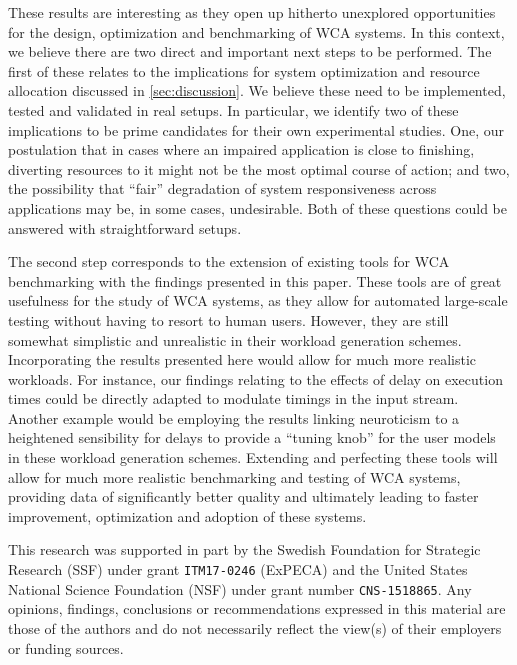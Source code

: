 These results are interesting as they open up hitherto unexplored opportunities for the design, optimization and benchmarking of WCA systems.
In this context, we believe there are two direct and important next steps to be performed.
The first of these relates to the implications for system optimization and resource allocation discussed in \cref{sec:discussion}.
We believe these need to be implemented, tested and validated in real setups.
In particular, we identify two of these implications to be prime candidates for their own experimental studies.
One, our postulation that in cases where an impaired application is close to finishing, diverting resources to it might not be the most optimal course of action; and two, the possibility that ``fair'' degradation of system responsiveness across applications may be, in some cases, undesirable.
Both of these questions could be answered with straightforward setups.

The second step corresponds to the extension of existing tools for WCA benchmarking with the findings presented in this paper.
These tools are of great usefulness for the study of WCA systems, as they allow for automated large-scale testing without having to resort to human users.
However, they are still somewhat simplistic and unrealistic in their workload generation schemes.
Incorporating the results presented here would allow for much more realistic workloads.
For instance, our findings relating to the effects of delay on execution times could be directly adapted to modulate timings in the input stream.
Another example would be employing the results linking neuroticism to a heightened sensibility for delays to provide a ``tuning knob'' for the user models in these workload generation schemes.
Extending and perfecting these tools will allow for much more realistic benchmarking and testing of WCA systems, providing data of significantly better quality and ultimately leading to faster improvement, optimization and adoption of these systems.

\begin{acks}
  This research was supported in part by the Swedish Foundation for Strategic Research (SSF) under grant \texttt{ITM17-0246} (ExPECA) and the United States National Science Foundation (NSF) under grant number \texttt{CNS-1518865}.
  Any opinions, findings, conclusions or recommendations expressed in this material are those of the authors and do not necessarily reflect the view(s) of their employers or funding sources.
\end{acks}